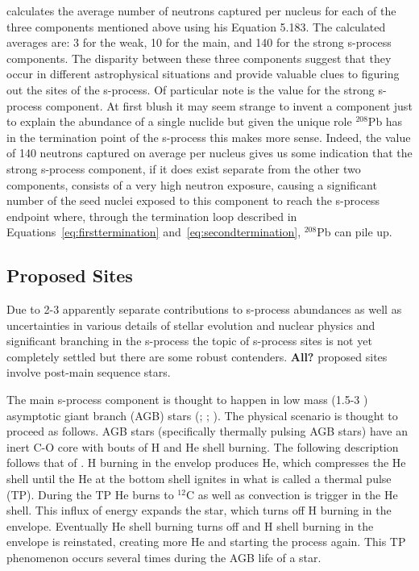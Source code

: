 \cite{iliadis2008} calculates the average number of neutrons captured
per nucleus for each of the three components mentioned above using his
Equation 5.183.  The calculated averages are: 3 for the weak, 10 for
the main, and 140 for the strong s-process components.  The disparity
between these three components suggest that they occur in different
astrophysical situations and provide valuable clues to figuring out
the sites of the s-process.  Of particular note is the value for the
strong s-process component.  At first blush it may seem strange to
invent a component just to explain the abundance of a single nuclide
but given the unique role $^{208}$Pb has in the termination point of
the s-process this makes more sense.  Indeed, the value of 140
neutrons captured on average per nucleus gives us some indication that
the strong s-process component, if it does exist separate from the
other two components, consists of a very high neutron exposure,
causing a significant number of the seed nuclei exposed to this
component to reach the s-process endpoint where, through the
termination loop described in Equations~\ref{eq:firsttermination}
and~\ref{eq:secondtermination}, $^{208}$Pb can pile up.

\subsection{Proposed Sites}

Due to 2-3 apparently separate contributions to s-process abundances
as well as uncertainties in various details of stellar evolution and
nuclear physics and significant branching in the s-process 
the topic of s-process sites is not yet completely
settled but there are some robust contenders.  {\bf All?} proposed
sites involve post-main sequence stars.  

The main s-process component is thought to happen in low mass
(1.5-3 \Msol) asymptotic giant branch (AGB) stars
(\citealt{schwarzschild1967}; \citealt{bussoetal1999}; \citealt{arlandinietal1999}).
The physical scenario is thought to proceed as follows.  AGB stars
(specifically thermally pulsing AGB stars)
have an inert C-O core with bouts of H and He shell burning.  The
following description follows that of \cite{kappeleretal2011}.  H
burning in the envelop produces He, which compresses the He shell
until the He at the bottom shell ignites in what is called a thermal
pulse (TP).  During the TP He burns to $^{12}$C as well as convection
is trigger in the He shell.  This influx of energy expands the star,
which turns off H burning in the envelope.  Eventually He shell
burning turns off and H shell burning in the envelope is reinstated,
creating more He and starting the process again.  This TP phenomenon 
occurs several times during the AGB life of a star.

